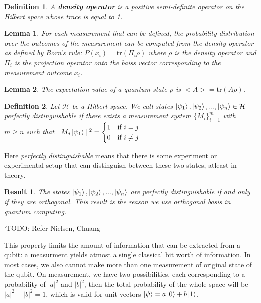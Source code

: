 \documentclass[12pt,twoside,fleqn]{report}
\theoremstyle{thmstyle}
\newtheorem{defn}{Definition}[chapter]
\newtheorem{lemma}{Lemma}[chapter]
\newtheorem{result}{Result}[chapter]
\begin{document}
\begin{defn}
    A \textbf{density operator} is a positive semi-definite operator on the Hilbert space whose trace is equal to 1.
\end{defn}

\begin{lemma}
    For each measurement that can be defined, the probability distribution over the outcomes of the measurement can be computed from the density operator as defined by Born's rule:
    $P(x_i) = \text{tr}(\Pi_i \rho)$ where $\rho$ is the density operator and $\Pi_i$ is the projection operator onto the baiss vector corresponding to the measurement outcome $x_i$.
\end{lemma}

\begin{lemma}
    The expectation value of a quantum state $\rho$ is $<A> = \text{tr}(A \rho)$.
\end{lemma}

\begin{defn}
    Let $\mathcal{H}$ be a Hilbert space. We call states $\ket{\psi_1}, \ket{\psi_2}, ..., \ket{\psi_n} \in \mathcal{H}$ perfectly distinguishable if there exists a measurement system $\{ M_i \}_{i=1}^m$ with $m \geq n$ such that $|| M_j \ket{\psi_1} ||^2 = \begin{cases} 1 & \text{if } i = j \\ 0 & \text{if } i \neq j \end{cases}$
\end{defn}
Here \textit{perfectly distinguishable} means that there is some experiment or experimental setup that can distinguish between these two states, atleast in theory.
\begin{result}
    The states $\ket{\psi_1}, \ket{\psi_2}, ..., \ket{\psi_n}$ are perfectly distinguishable if and only if they are orthogonal. This result is the reason we use orthogonal basis in quantum computing.
\end{result}
`TODO: Refer Nielsen, Chuang

This property limits the amount of information that can be extracted from a qubit: a measurment yields atmost a single classical bit worth of information. In most cases, we also cannot make more than one measurement of original state of the qubit. On measurement, we have two possibilities, each corresponding to a probability of $|a|^2$ and $|b|^2$, then the total probability of the whole space will be $|a|^2 + |b|^2 = 1$, which is valid for unit vectors $\ket{\psi} = a \ket{0} + b \ket{1}$.
\end{document}
